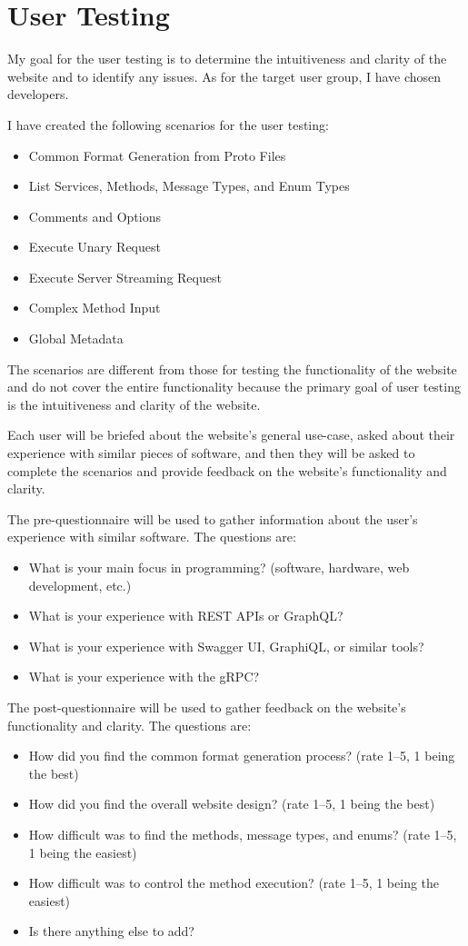\section{User Testing}
My goal for the user testing is to determine the intuitiveness and clarity of the website and to identify any issues.
As for the target user group, I have chosen developers.

I have created the following scenarios for the user testing:
\begin{itemize}
    \item Common Format Generation from Proto Files
    \item List Services, Methods, Message Types, and Enum Types
    \item Comments and Options
    \item Execute Unary Request
    \item Execute Server Streaming Request
    \item Complex Method Input
    \item Global Metadata
\end{itemize}

The scenarios are different from those for testing the functionality of the website
and do not cover the entire functionality
because the primary goal of user testing is the intuitiveness and clarity of the website.

Each user will be briefed about the website's general use-case,
asked about their experience with similar pieces of software,
and then they will be asked to complete the scenarios
and provide feedback on the website's functionality and clarity.

The pre-questionnaire will be used to gather information about the user's experience with similar software.
The questions are:
\begin{itemize}
    \item What is your main focus in programming?
    (software, hardware, web development, etc.)
    \item What is your experience with REST APIs or GraphQL?
    \item What is your experience with Swagger UI, GraphiQL, or similar tools?
    \item What is your experience with the gRPC?
\end{itemize}

The post-questionnaire will be used to gather feedback on the website's functionality and clarity.
The questions are:
\begin{itemize}
    \item How did you find the common format generation process?
    (rate 1--5, 1 being the best)
    \item How did you find the overall website design?
    (rate 1--5, 1 being the best)
    \item How difficult was to find the methods, message types, and enums?
    (rate 1--5, 1 being the easiest)
    \item How difficult was to control the method execution?
    (rate 1--5, 1 being the easiest)
    \item Is there anything else to add?
\end{itemize}

